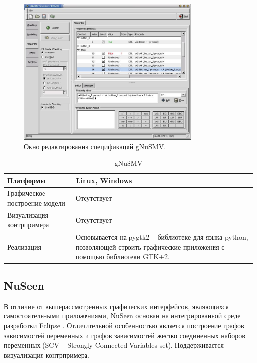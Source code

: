 \begin{figure}[htbp]
	\centering
	\includegraphics[width=0.8\textwidth]{fig/gnusmv2.jpg}
	\caption{Окно редактирования спецификаций gNuSMV.}
	\label{fig:gnusmv2}
\end{figure}

\begin{table}[ht]
	\caption{gNuSMV}\label{tab:gnusmv}
	\centering
	\begin{tabular}{|m{2.5 cm}|m{7.5 cm}|}
		\hline
		Платформы & Linux, Windows \\
		\hline
		Графическое построение модели &Отсутствует \\
		\hline
		Визуализация контрпримера & Отсутствует \\
		\hline
		Реализация & Основывается на pygtk2 – библиотеке для языка python, позволяющей строить графические приложения с помощью библиотеки GTK+2.\\
		\hline
	\end{tabular}
\end{table}

\subsection{NuSeen}

В отличие от вышерассмотренных графических интерфейсов, являющихся самостоятельными приложениями, NuSeen основан на интегрированной среде разработки Eclipse \cite{nuseen}. Отличительной особенностью является построение графов зависимостей переменных и графов зависимостей жестко соединенных наборов переменных (SCV – Strongly Connected Variables set). Поддерживается визуализация контрпримера.

